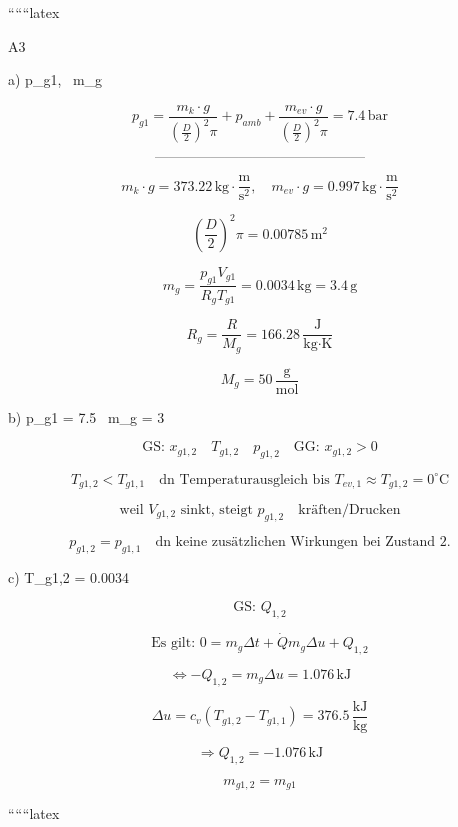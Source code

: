 
``````latex


A3

a) \quad {} p_{g1}, \, m_g

\[
p_{g1} = \frac{m_k \cdot g}{\left(\frac{D}{2}\right)^2 \pi} + p_{amb} + \frac{m_{ev} \cdot g}{\left(\frac{D}{2}\right)^2 \pi} = 7.4 \, \text{bar}
\]

\[
\text{---------------------------------------------}
\]

\[
m_k \cdot g = 373.22 \, \text{kg} \cdot \frac{\text{m}}{\text{s}^2}, \quad m_{ev} \cdot g = 0.997 \, \text{kg} \cdot \frac{\text{m}}{\text{s}^2}
\]

\[
\left(\frac{D}{2}\right)^2 \pi = 0.00785 \, \text{m}^2
\]

\[
m_g = \frac{p_{g1} V_{g1}}{R_g T_{g1}} = 0.0034 \, \text{kg} = 3.4 \, \text{g}
\]

\[
R_g = \frac{R}{M_g} = 166.28 \, \frac{\text{J}}{\text{kg} \cdot \text{K}}
\]

\[
M_g = 50 \, \frac{\text{g}}{\text{mol}}
\]

b) \quad {} p_{g1} = 7.5 \,  m_g = 3 \,  

\[
\text{GS: } x_{g1,2} \quad T_{g1,2} \quad p_{g1,2} \quad \text{GG: } x_{g1,2} > 0
\]


\[
T_{g1,2} < T_{g1,1} \quad \text{dn Temperaturausgleich bis } T_{ev,1} \approx T_{g1,2} = 0^\circ \text{C}
\]

\[
\text{weil } V_{g1,2} \text{ sinkt, steigt } p_{g1,2} \quad \text{kräften/Drucken}
\]

\[
p_{g1,2} = p_{g1,1} \quad \text{dn keine zusätzlichen Wirkungen bei Zustand 2.}
\]

c) \quad {} T_{g1,2} = 0.0034 \,  

\[
\text{GS: } Q_{1,2}
\]

\[
\text{Es gilt: } 0 = m_g \Delta t + \dot{Q} m_g \Delta u + Q_{1,2}
\]

\[
\Leftrightarrow -Q_{1,2} = m_g \Delta u = 1.076 \, \text{kJ}
\]

\[
\Delta u = c_v (T_{g1,2} - T_{g1,1}) = 376.5 \, \frac{\text{kJ}}{\text{kg}}
\]

\[
\Rightarrow Q_{1,2} = -1.076 \, \text{kJ}
\]

\[
m_{g1,2} = m_{g1}
\]

``````latex


